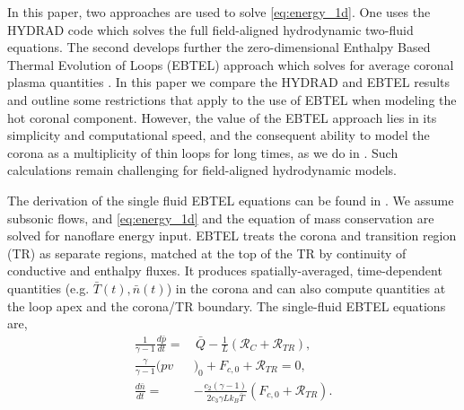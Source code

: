 \documentclass[apj]{emulateapj}
\begin{document}
\par In this paper, two approaches are used to solve \autoref{eq:energy_1d}. One uses the HYDRAD code \citep{bradshaw_influence_2013} which solves the full field-aligned hydrodynamic two-fluid equations. The second develops further the zero-dimensional Enthalpy Based Thermal Evolution of Loops (EBTEL) approach which solves for average coronal plasma quantities \citep{klimchuk_highly_2008,cargill_enthalpy-based_2012,cargill_enthalpy-based_2012-1,cargill_modelling_2015}. In this paper we compare the HYDRAD and EBTEL results and outline some restrictions that apply to the use of EBTEL when modeling the hot coronal component. However, the value of the EBTEL approach lies in its simplicity and computational speed, and the consequent ability to model the corona as a multiplicity of thin loops for long times, as we do in . Such calculations remain challenging for field-aligned hydrodynamic models. 
	\par The derivation of the single fluid EBTEL equations can be found in \citep{klimchuk_highly_2008,cargill_enthalpy-based_2012}. We assume subsonic flows, and \autoref{eq:energy_1d} and the equation of mass conservation are solved for nanoflare energy input. EBTEL treats the corona and transition region (TR) as separate regions, matched at the top of the TR by continuity of conductive and enthalpy fluxes. It produces spatially-averaged, time-dependent quantities (e.g. $\bar{T}(t),\bar{n}(t)$) in the corona and can also compute quantities at the loop apex and the corona/TR boundary. The single-fluid EBTEL equations are,
	\begin{align}
		\frac{1}{\gamma - 1}\frac{d\bar{p}}{dt} =& \,\bar{Q} - \frac{1}{L}(\mathcal{R}_C + \mathcal{R}_{TR}), \label{eq:energy_0d} \\
		\frac{\gamma}{\gamma - 1}(pv&)_0 + F_{c,0} + \mathcal{R}_{TR} = 0, \label{eq:tr_energy_0d} \\
		\frac{d\bar{n}}{dt} =& -\frac{c_2(\gamma - 1)}{2c_3\gamma Lk_B\bar{T}}(F_{c,0} + \mathcal{R}_{TR}).\label{eq:mass_0d}
	\end{align}
\end{document}
